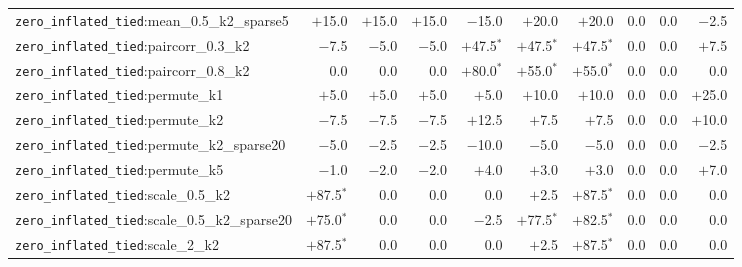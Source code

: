 \begin{table}[!tp]
\begin{tabular*}{\textwidth}{@{\extracolsep{\fill}}lrrrrrrrrr}
\texttt{zero\_inflated\_tied}:mean\_0.5\_k2\_sparse5 & $+$15.0 & $+$15.0 & $+$15.0 & $-$15.0 & $+$20.0 & $+$20.0 & 0.0 & 0.0 & $-$2.5 \\
\texttt{zero\_inflated\_tied}:paircorr\_0.3\_k2 & $-$7.5 & $-$5.0 & $-$5.0 & $+$47.5$^{*}$ & $+$47.5$^{*}$ & $+$47.5$^{*}$ & 0.0 & 0.0 & $+$7.5 \\
\texttt{zero\_inflated\_tied}:paircorr\_0.8\_k2 & 0.0 & 0.0 & 0.0 & $+$80.0$^{*}$ & $+$55.0$^{*}$ & $+$55.0$^{*}$ & 0.0 & 0.0 & 0.0 \\
\texttt{zero\_inflated\_tied}:permute\_k1 & $+$5.0 & $+$5.0 & $+$5.0 & $+$5.0 & $+$10.0 & $+$10.0 & 0.0 & 0.0 & $+$25.0 \\
\texttt{zero\_inflated\_tied}:permute\_k2 & $-$7.5 & $-$7.5 & $-$7.5 & $+$12.5 & $+$7.5 & $+$7.5 & 0.0 & 0.0 & $+$10.0 \\
\texttt{zero\_inflated\_tied}:permute\_k2\_sparse20 & $-$5.0 & $-$2.5 & $-$2.5 & $-$10.0 & $-$5.0 & $-$5.0 & 0.0 & 0.0 & $-$2.5 \\
\texttt{zero\_inflated\_tied}:permute\_k5 & $-$1.0 & $-$2.0 & $-$2.0 & $+$4.0 & $+$3.0 & $+$3.0 & 0.0 & 0.0 & $+$7.0 \\
\texttt{zero\_inflated\_tied}:scale\_0.5\_k2 & $+$87.5$^{*}$ & 0.0 & 0.0 & 0.0 & $+$2.5 & $+$87.5$^{*}$ & 0.0 & 0.0 & 0.0 \\
\texttt{zero\_inflated\_tied}:scale\_0.5\_k2\_sparse20 & $+$75.0$^{*}$ & 0.0 & 0.0 & $-$2.5 & $+$77.5$^{*}$ & $+$82.5$^{*}$ & 0.0 & 0.0 & 0.0 \\
\texttt{zero\_inflated\_tied}:scale\_2\_k2 & $+$87.5$^{*}$ & 0.0 & 0.0 & 0.0 & $+$2.5 & $+$87.5$^{*}$ & 0.0 & 0.0 & 0.0 \\
\bottomrule
\end{tabular*}
\end{table}
